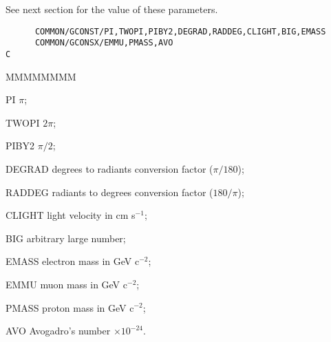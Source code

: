 See next section for the value of these parameters.
\begin{verbatim}
      COMMON/GCONST/PI,TWOPI,PIBY2,DEGRAD,RADDEG,CLIGHT,BIG,EMASS
      COMMON/GCONSX/EMMU,PMASS,AVO
C
\end{verbatim}
\begin{DLtt}{MMMMMMMM}
\item[PI]     $\pi$;
\item[TWOPI]  $2\pi$;
\item[PIBY2]  $\pi/2$;
\item[DEGRAD] degrees to radiants conversion factor ($\pi/180$);
\item[RADDEG] radiants to degrees conversion factor ($180/\pi$);
\item[CLIGHT] light velocity in cm s$^{-1}$;
\item[BIG]    arbitrary large number;
\item[EMASS]  electron mass in GeV c$^{-2}$;
\item[EMMU]   muon mass in GeV c$^{-2}$;
\item[PMASS]  proton mass in GeV c$^{-2}$;
\item[AVO]    Avogadro's number $\times 10^{-24}$.
\end{DLtt}
 
